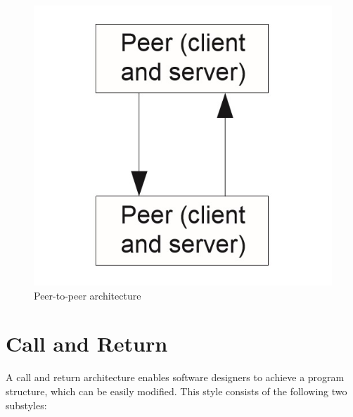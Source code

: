 \documentclass{article}
\begin{document}
\begin{figure}[h]
\centering
\includegraphics[scale=0.5]{p2p.jpg}
\caption{Peer-to-peer architecture}
\label{fig_mbr}
\end{figure}
\newpage



\section{Call and Return}
A call and return architecture enables software designers to achieve a program structure, which can be easily modified. This style consists of the following two substyles: \\
\end{document}
